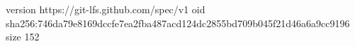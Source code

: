 version https://git-lfs.github.com/spec/v1
oid sha256:746da79e8169dccfe7ea2fba487acd124dc2855bd709b045f21d46a6a9cc9196
size 152
